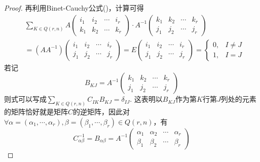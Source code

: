 \begin{proof}
再利用Binet-Cauchy公式()，计算可得
\begin{equation}
\begin{split}
&\sum\limits_{K\in Q(r,n)}A\left(\begin{array}{cccc}i_{1} & i_{2} & \cdots & i_{r} \\k_{1} & k_{2} & \cdots & k_{r}\end{array}\right)\cdot A^{-1}\left(\begin{array}{cccc}k_{1} & k_{2} & \cdots & k_{r} \\j_{1} & j_{2} & \cdots & j_{r}\end{array}\right)\\
&=\left( AA^{-1} \right)\left(\begin{array}{cccc}i_{1} & i_{2} & \cdots & i_{r} \\j_{1} & j_{2} & \cdots & j_{r}\end{array}\right)=E\left(\begin{array}{cccc}i_{1} & i_{2} & \cdots & i_{r} \\j_{1} & j_{2} & \cdots & j_{r}\end{array}\right)=
	\begin{cases}
		0,& I\neq J\\
		1,& I=J
	\end{cases}
\end{split}
\label{Binet-Cauchy公式计算}
\end{equation}
若记
\[
B_{KJ}=A^{-1}\left(\begin{array}{cccc}k_{1} & k_{2} & \cdots & k_{r} \\j_{1} & j_{2} & \cdots & j_{r}\end{array}\right)
\]
则式可以写成$\sum\limits_{K\in Q(r,n)}C_{IK}B_{KJ}=\delta_{IJ}$. 这表明以$B_{KJ}$作为第$K$行第$J$列处的元素的矩阵恰好就是矩阵$C$的逆矩阵，因此对$\forall \alpha=(\alpha_{1},\cdots,\alpha_{r}),\beta=(\beta_{1},\cdots,\beta_{r})\in Q(r,n)$，有
\[
C^{-1}_{\alpha\beta}=B_{\alpha\beta}=A^{-1}\left(\begin{array}{cccc}\alpha_{1} & \alpha_{2} & \cdots & \alpha_{r} \\\beta_{1} & \beta_{2} & \cdots & \beta_{r}\end{array}\right)
\]
\end{proof}

